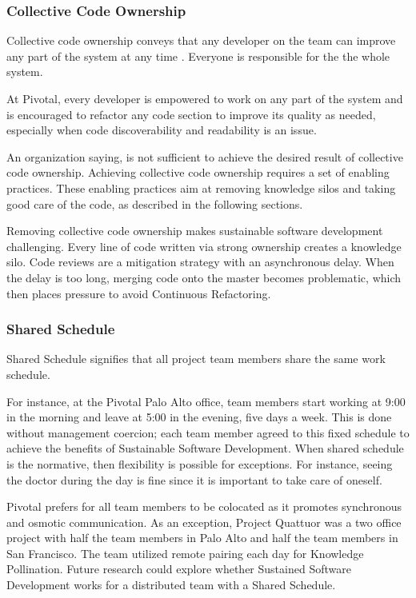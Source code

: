 \begin{table}[]
\subsubsection{Collective Code Ownership}
Collective code ownership conveys that any developer on the team can improve any part of the system at any time \cite{ExtremeProgramming2004}. Everyone is responsible for the the whole system. 

At Pivotal, every developer is empowered to work on any part of the system and is encouraged to refactor any code section to improve its quality as needed, especially when code discoverability and readability is an issue.

An organization saying,  is not sufficient to achieve the desired result of collective code ownership. Achieving collective code ownership requires a set of enabling practices. These enabling practices aim at removing knowledge silos and taking good care of the code, as described in the following sections.

Removing collective code ownership makes sustainable software development challenging. Every line of code written via strong ownership creates a knowledge silo. Code reviews are a mitigation strategy with an asynchronous delay. When the delay is too long, merging code onto the master becomes problematic, which then places pressure to avoid Continuous Refactoring.  

\subsubsection{Shared Schedule}

Shared Schedule signifies that all project team members share the same work schedule. 

For instance, at the Pivotal Palo Alto office, team members start working at 9:00 in the morning and leave at 5:00 in the evening, five days a week. This is done without management coercion; each team member agreed to this fixed schedule to achieve the benefits of Sustainable Software Development. When shared schedule is the normative, then flexibility is possible for exceptions. For instance, seeing the doctor during the day is fine since it is important to take care of oneself.

Pivotal prefers for all team members to be colocated as it promotes synchronous and osmotic communication. As an exception, Project Quattuor was a two office project with half the team members in Palo Alto and half the team members in San Francisco. The team utilized remote pairing each day for Knowledge Pollination. Future research could explore whether Sustained Software Development works for a distributed team with a Shared Schedule.


\end{table}
